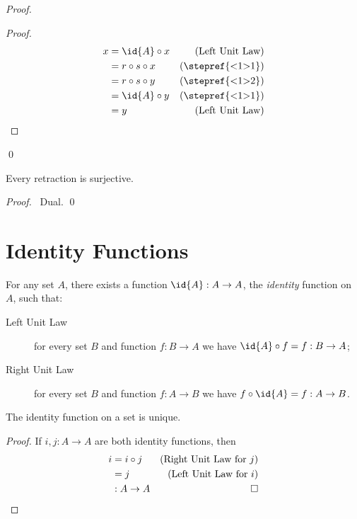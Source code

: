 \begin{proof}
  \pf
  \begin{proof}
    \pf
    \begin{align*}
      x & = \id{A} \circ x & (\text{Left Unit Law}) \\
      & = r \circ s \circ x & (\text{\stepref{<1>1}}) \\
      & = r \circ s \circ y & (\text{\stepref{<1>2}}) \\
      & = \id{A} \circ y & (\text{\stepref{<1>1}}) \\
      & = y & (\text{Left Unit Law})
    \end{align*}
  \end{proof}
  \qed
\end{proof}

\begin{prop}
  \label{prop:sets:retraction:surjective}
  Every retraction is surjective.
\end{prop}

\begin{proof}
  \pf\ Dual. \qed
\end{proof}

\section{Identity Functions}

\begin{ax}
  For any set $A$, there exists a function $\id{A} : A \rightarrow A$, the
  \emph{identity} function on $A$, such that:
  \begin{description}
    \item[Left Unit Law] for every set $B$ and function $f : B \rightarrow A$
    we have $\id{A} \circ f = f : B \rightarrow A$;
    \item[Right Unit Law] for every set $B$ and function $f : A \rightarrow
    B$ we have $f \circ \id{A} = f : A \rightarrow B$.
  \end{description}
\end{ax}

\begin{prop}
  The identity function on a set is unique.
\end{prop}

\begin{proof}
  \pf If $i, j : A \rightarrow A$ are both identity functions, then
  \begin{align*}
    i & = i \circ j & (\text{Right Unit Law for } j) \\
    & = j & (\text{Left Unit Law for } i) \\
    & : A \rightarrow A & \qed
  \end{align*}
\end{proof}

